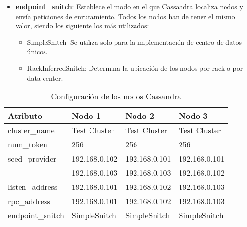 \begin{itemize}
\item \textbf{endpoint\_snitch}: Establece el modo en el que Cassandra localiza nodos y envía peticiones de enrutamiento. Todos los nodos han de tener el mismo valor, siendo los siguiente los más utilizados:

\begin{itemize}
	\item SimpleSnitch: Se utiliza solo para la implementación de centro de datos únicos.
	\item RackInferredSnitch: Determina la ubicación de los nodos por rack o por data center.
\end{itemize}
	 
\end{itemize}
	 
\begin{table}[h!]
	\centering
	\begin{tabular}{|l||l|l|l|}
		
		\hline
		
		\textbf{Atributo} & \textbf{Nodo} 1 & \textbf{Nodo 2} & \textbf{Nodo 3} \\
		
		\hline
		\hline
		
		cluster\_name & Test Cluster & Test Cluster & Test Cluster \\
		
		\hline
		
		num\_token & 256 & 256 & 256 \\
		
		\hline
		
		seed\_provider & 192.168.0.102 & 192.168.0.101 & 192.168.0.101 \\ 
		               & 192.168.0.103 & 192.168.0.103 & 192.168.0.102 \\ 
		
		\hline
		
		listen\_address & 192.168.0.101 & 192.168.0.102 & 192.168.0.103 \\
		
		\hline
		
		rpc\_address & 192.168.0.101 & 192.168.0.102 & 192.168.0.103 \\
		
		\hline
		
		endpoint\_snitch & SimpleSnitch & SimpleSnitch & SimpleSnitch \\
		
		\hline
		
	\end{tabular}
	\caption{Configuración de los nodos Cassandra}
	\label{configuracion-nodos-cassandra}
\end{table}

